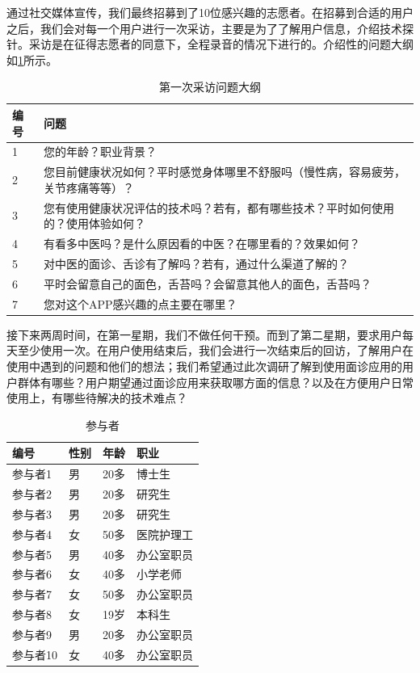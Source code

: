 通过社交媒体宣传，我们最终招募到了10位感兴趣的志愿者。在招募到合适的用户之后，我们会对每一个用户进行一次采访，主要是为了了解用户信息，介绍技术探针。采访是在征得志愿者的同意下，全程录音的情况下进行的。介绍性的问题大纲如\ref{tab:inteview_questions}所示。

\begin{table}[]
    \caption{第一次采访问题大纲}
    \label{tab:inteview_questions}
    \begin{tabular}{ll}
        \toprule
        编号 & 问题 \\
        \midrule
        1  & 您的年龄？职业背景？   \\
        2  & 您目前健康状况如何？平时感觉身体哪里不舒服吗（慢性病，容易疲劳，关节疼痛等等）？   \\
        3  &  您有使用健康状况评估的技术吗？若有，都有哪些技术？平时如何使用的？使用体验如何？  \\
         4  & 有看多中医吗？是什么原因看的中医？在哪里看的？效果如何？   \\
        5   & 对中医的面诊、舌诊有了解吗？若有，通过什么渠道了解的？   \\
         6  & 平时会留意自己的面色，舌苔吗？会留意其他人的面色，舌苔吗？\\
        7   & 您对这个APP感兴趣的点主要在哪里？\\
        \bottomrule
    \end{tabular}
\end{table}

接下来两周时间，在第一星期，我们不做任何干预。而到了第二星期，要求用户每天至少使用一次。在用户使用结束后，我们会进行一次结束后的回访，了解用户在使用中遇到的问题和他们的想法；我们希望通过此次调研了解到使用面诊应用的用户群体有哪些？用户期望通过面诊应用来获取哪方面的信息？以及在方便用户日常使用上，有哪些待解决的技术难点？

\begin{table}
  \caption{参与者}
  \centering
  \label{tab:Participants}
  \begin{tabular}{llll}
        \toprule
        编号 &	性别 &	年龄 &	职业 \\
        \midrule
        参与者1 &	男 &	20多 &	博士生 \\
        参与者2 &	男 &	20多 &	研究生 \\
        参与者3 &	男 &	20多 &	研究生 \\
        参与者4 &	女 &	50多 &	医院护理工 \\
        参与者5 &	男 &	40多 &	办公室职员 \\
        参与者6 &	女 &	40多 &	小学老师 \\
        参与者7 &	女 &	50多 &	办公室职员 \\
        参与者8 &	女 &	19岁 &	本科生 \\
        参与者9 &	男 &	20多 &	办公室职员 \\
        参与者10 &	女 &	40多 &	办公室职员 \\
        \bottomrule
  \end{tabular}
\end{table}


